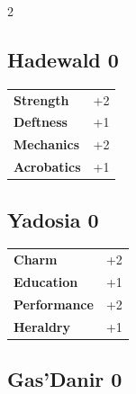 \begin{multicols}{2}
\begin{tcolorbox}

\end{tcolorbox}

\begin{tcolorbox}
    \subsection*{Hadewald \hfill \small{0 }}
    \tcblower




\begin{tabular}{@{}ll@{}}
    \textbf{Strength} & +2\\
    \textbf{Deftness} & +1\\
    \textbf{Mechanics} & +2\\
    \textbf{Acrobatics} & +1\\
\end{tabular}


\end{tcolorbox}

\begin{tcolorbox}
    \subsection*{Yadosia \hfill \small{0 }}
    \tcblower




\begin{tabular}{@{}ll@{}}
    \textbf{Charm} & +2\\
    \textbf{Education} & +1\\
    \textbf{Performance} & +2\\
    \textbf{Heraldry} & +1\\
\end{tabular}


\end{tcolorbox}

\begin{tcolorbox}
    \subsection*{Gas'Danir \hfill \small{0 }}
    \tcblower





\end{tcolorbox}
\end{multicols}
